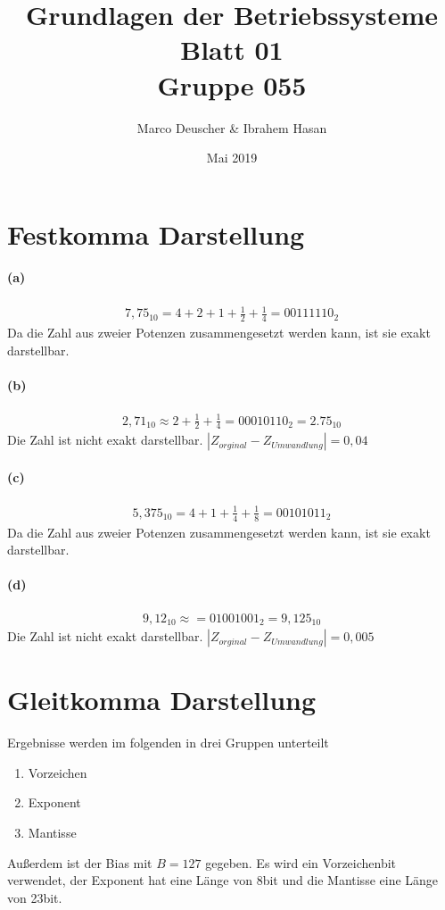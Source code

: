 \documentclass[a4paper]{article}
\title{Grundlagen der Betriebssysteme\\ Blatt 01 \\ Gruppe 055}
\author{Marco Deuscher & Ibrahem Hasan}
\date{Mai 2019}
\begin{document}
\maketitle

\section{Festkomma Darstellung}
\paragraph{(a)}
\begin{align*}
    7,75_{10}=4+2+1+\frac{1}{2}+\frac{1}{4}=00111110_2
\end{align*}
Da die Zahl aus zweier Potenzen zusammengesetzt werden kann, ist sie exakt darstellbar.


\paragraph{(b)}
\begin{align*}
    2,71_{10}\approx2+\frac{1}{2}+\frac{1}{4}=00010110_2=2.75_{10}
\end{align*}
Die Zahl ist nicht exakt darstellbar. $|Z_{orginal}-Z_{Umwandlung}|=0,04$


\paragraph{(c)}
\begin{align*}
    5,375_{10} = 4+1+\frac{1}{4}+\frac{1}{8}=00101011_2
\end{align*}
Da die Zahl aus zweier Potenzen zusammengesetzt werden kann, ist sie exakt darstellbar.

\paragraph{(d)}
\begin{align*}
    9,12_{10}\approx=01001001_2=9,125_{10}
\end{align*}
Die Zahl ist nicht exakt darstellbar. $|Z_{orginal}-Z_{Umwandlung}|=0,005$

\section{Gleitkomma Darstellung}
Ergebnisse werden im folgenden in drei Gruppen unterteilt
\begin{enumerate}
    \item Vorzeichen
    \item Exponent
    \item Mantisse
\end{enumerate}
Außerdem ist der Bias mit $B=127$ gegeben. Es wird ein Vorzeichenbit verwendet, der Exponent hat eine Länge von 8bit und die Mantisse eine Länge von 23bit.
\end{document}
